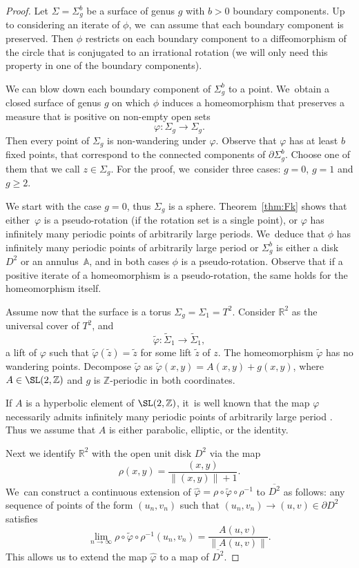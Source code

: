 \begin{proof}
Let $\Sigma=\Sigma_g^b$ be a surface of genus $g$ with $b>0$ boundary components. Up to considering an iterate of $\phi$, we~can assume that each boundary component is preserved. Then $\phi$ restricts on each boundary component to a diffeomorphism of the circle that is conjugated to an irrational rotation (we will only need this property in one of the boundary components).

We can blow down each boundary component of $\Sigma_g^b$ to a point. We~obtain a closed surface of genus $g$ on which $\phi$ induces a homeomorphism that preserves a measure that is positive on non-empty open sets
\[
\varphi: \Sigma_g \to \Sigma_g.
\]
Then every point of $\Sigma_g$ is non-wandering under $\varphi$.
Observe that $\varphi$ has at least $b$ fixed points, that correspond to the connected components of $\partial \Sigma_g^b$. Choose one of them that we call $z\in \Sigma_g$. For the proof, we~consider three cases: $g=0$, $g=1$ and $g\geq 2$.

We start with the case $g=0$, thus $\Sigma_g$ is a sphere. Theorem~\ref{thm:Fk} shows that either~$\varphi$ is a pseudo-rotation (if the rotation set is a single point), or $\varphi$ has infinitely many periodic points of arbitrarily large periods. We~deduce that $\phi$ has infinitely many periodic points of arbitrarily large period or $\Sigma_g^b$ is either a disk $D^2$ or an annulus~$\mathbb{A}$, and in both cases $\phi$ is a pseudo-rotation. Observe that if a positive iterate of a homeomorphism is a pseudo-rotation, the same holds for the homeomorphism itself.

Assume now that the surface is a torus $\Sigma_g=\Sigma_1=T^2$. Consider $\mathbb{R}^2$ as the universal cover of $T^2$, and
\[
\widetilde \varphi: \widetilde \Sigma_1 \to \widetilde \Sigma_1,
\]
a lift of $\varphi$ such that $\widetilde \varphi(\widetilde z)=\widetilde z$ for some lift $\widetilde z$ of $z$. The homeomorphism $\widetilde \varphi$ has no wandering points. Decompose $\widetilde \varphi$ as
$\widetilde \varphi(x,y)= A(x,y) + g(x,y)$,
where $A\in \SL(2,\mathbb{Z})$ and $g$ is $\mathbb{Z}$-periodic in both coordinates.

If $A$ is a hyperbolic element of $\SL(2,\mathbb{Z})$, it~is well known that the map $\varphi$ necessarily admits infinitely many periodic points of arbitrarily large period \cite{F0, Ha}. Thus we assume that $A$ is either parabolic, elliptic, or the identity.

Next we identify $\mathbb{R}^2$ with the open unit disk $D^2$ via the map
\[
\rho(x,y)=\frac{(x,y)}{\|(x,y)\|+1}.
\]
We~can construct a continuous extension of $\widehat \varphi= \rho\circ \widetilde \varphi \circ \rho^{-1}$ to $ \overline{D^2}$ as follows: any sequence of points of the form $(u_n,v_n)$ such that $ (u_n,v_n) \rightarrow (u,v) \in \partial D^2$ satisfies
\[
\lim_{n \to \infty} \rho \circ \widetilde \varphi \circ \rho^{-1} (u_n,v_n) = \frac{A(u,v)}{\|A(u,v)\|}.
\]
This allows us to extend the map $\widehat \varphi$ to a map of $\overline{D^2}$.


\end{proof}
